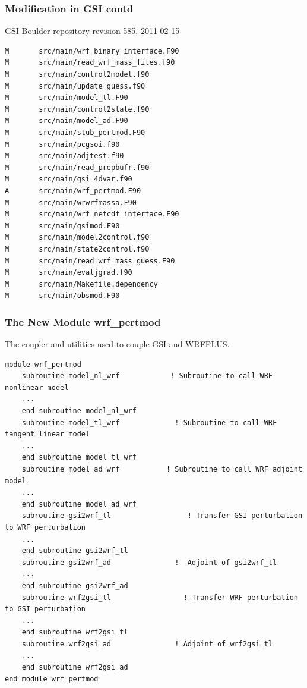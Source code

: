 \documentclass[10pt]{beamer}
\begin{document}
\begin{frame}[fragile]
\frametitle{Modification in GSI contd}
GSI Boulder repository revision 585, 2011-02-15
\begin{beamerboxesrounded}[ lower=postit,shadow=true]{}
{\tiny
\begin{verbatim}
M       src/main/wrf_binary_interface.F90
M       src/main/read_wrf_mass_files.f90
M       src/main/control2model.f90
M       src/main/update_guess.f90
M       src/main/model_tl.F90
M       src/main/control2state.f90
M       src/main/model_ad.F90
M       src/main/stub_pertmod.F90
M       src/main/pcgsoi.f90
M       src/main/adjtest.f90
M       src/main/read_prepbufr.f90
M       src/main/gsi_4dvar.f90
A       src/main/wrf_pertmod.F90
M       src/main/wrwrfmassa.F90
M       src/main/wrf_netcdf_interface.F90
M       src/main/gsimod.F90
M       src/main/model2control.f90
M       src/main/state2control.f90
M       src/main/read_wrf_mass_guess.F90
M       src/main/evaljgrad.f90
M       src/main/Makefile.dependency
M       src/main/obsmod.F90
\end{verbatim}
}
\end{beamerboxesrounded}
\end{frame}

\begin{frame}[fragile]
\frametitle{The New Module wrf\_pertmod}
The coupler and utilities used to couple GSI and WRFPLUS.
\begin{beamerboxesrounded}[ lower=postit,shadow=true]{}
{\tiny
\begin{verbatim}
module wrf_pertmod
    subroutine model_nl_wrf            ! Subroutine to call WRF nonlinear model
    ...
    end subroutine model_nl_wrf
    subroutine model_tl_wrf             ! Subroutine to call WRF tangent linear model
    ...
    end subroutine model_tl_wrf
    subroutine model_ad_wrf           ! Subroutine to call WRF adjoint model
    ...
    end subroutine model_ad_wrf
    subroutine gsi2wrf_tl                  ! Transfer GSI perturbation to WRF perturbation
    ...
    end subroutine gsi2wrf_tl
    subroutine gsi2wrf_ad               !  Adjoint of gsi2wrf_tl
    ...
    end subroutine gsi2wrf_ad
    subroutine wrf2gsi_tl                 ! Transfer WRF perturbation to GSI perturbation
    ...
    end subroutine wrf2gsi_tl
    subroutine wrf2gsi_ad               ! Adjoint of wrf2gsi_tl
    ...
    end subroutine wrf2gsi_ad
end module wrf_pertmod
\end{verbatim}
}
\end{beamerboxesrounded}
\end{frame}
\end{document}
